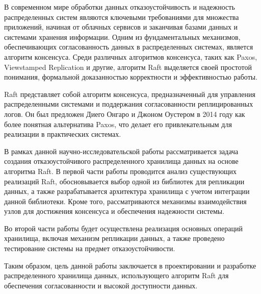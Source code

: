 \introduction

В современном мире обработки данных отказоустойчивость и надежность распределенных
систем являются ключевыми требованиями для множества приложений, начиная от облачных
сервисов и заканчивая базами данных и системами хранения информации. Одним из
фундаментальных механизмов, обеспечивающих согласованность данных в распределенных
системах, является алгоритм консенсуса. Среди различных алгоритмов консенсуса, таких
как Paxos, Viewstamped Replication и другие, алгоритм Raft выделяется своей простотой
понимания, формальной доказанностью корректности и эффективностью работы.

Raft представляет собой алгоритм консенсуса, предназначенный для управления
распределенными системами и поддержания согласованности реплицированных логов.
Он был предложен Диего Онгаро и Джоном Оустером в 2014 году как более понятная
альтернатива Paxos, что делает его привлекательным для реализации в практических
системах.

В рамках данной научно-исследовательской работы рассматривается задача создания
отказоустойчивого распределенного хранилища данных на основе алгоритма Raft. В первой
части работы проводится анализ существующих реализаций Raft, обосновывается выбор одной
из библиотек для репликации данных, а также разрабатывается архитектура хранилища с
учетом интеграции данной библиотеки. Кроме того, рассматриваются механизмы взаимодействия
узлов для достижения консенсуса и обеспечения надежности системы.

Во второй части работы будет осуществлена реализация основных операций хранилища,
включая механизм репликации данных, а также проведено тестирование системы на предмет
отказоустойчивости.

Таким образом, цель данной работы заключается в проектировании и разработке
распределенного хранилища данных, использующего алгоритм Raft для обеспечения
согласованности и высокой доступности данных.

